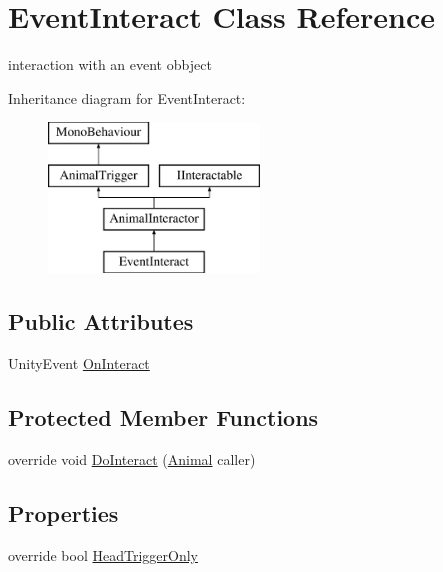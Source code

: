\hypertarget{class_event_interact}{}\section{Event\+Interact Class Reference}
\label{class_event_interact}


interaction with an event obbject  


Inheritance diagram for Event\+Interact\+:\begin{figure}[H]
\begin{center}
\leavevmode
\includegraphics[height=4.000000cm]{class_event_interact}
\end{center}
\end{figure}
\subsection*{Public Attributes}
\begin{DoxyCompactItemize}
\item 
Unity\+Event \mbox{\hyperlink{class_event_interact_abb244470fb0d4ff85e6615a7683b0211}{On\+Interact}}
\end{DoxyCompactItemize}
\subsection*{Protected Member Functions}
\begin{DoxyCompactItemize}
\item 
override void \mbox{\hyperlink{class_event_interact_a42b9c48803be9e90086d545a07fb1b74}{Do\+Interact}} (\mbox{\hyperlink{class_animal}{Animal}} caller)
\end{DoxyCompactItemize}
\subsection*{Properties}
\begin{DoxyCompactItemize}
\item 
override bool \mbox{\hyperlink{class_event_interact_a28eeadd71996cf25fa421aa7f124d114}{Head\+Trigger\+Only}}
\end{DoxyCompactItemize}
